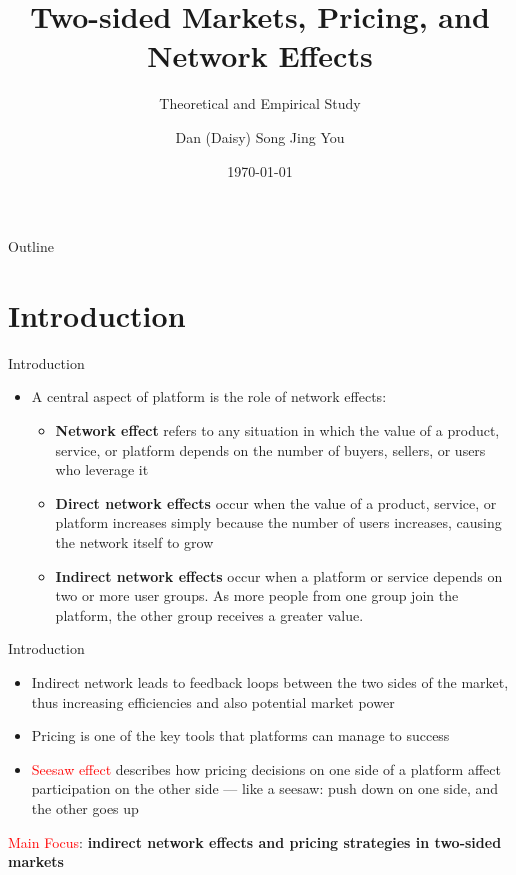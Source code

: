 \documentclass[aspectratio=169]{beamer}  %
\title{Two-sided Markets, Pricing, and Network Effects}
\subtitle{Theoretical and Empirical Study}
\author{Dan (Daisy) Song \quad Jing You}
\institute{Hong Kong University of Science and Technology}
\date{\today}
\begin{document}
\begin{frame}
    \titlepage
\end{frame}

\begin{frame}{Outline}
    \tableofcontents
\end{frame}

\section{Introduction}
\begin{frame}{Introduction}
    \begin{itemize}
        \item A central aspect of platform is the role of network effects:
        \vspace{1em}
        \begin{itemize}
            \item \textbf{Network effect} refers to any situation in which the value of a product, service, or platform depends on the number of buyers, sellers, or users who leverage it
            \vspace{1em}
            \item \textbf{Direct network effects} occur when the value of a product, service, or platform increases simply because the number of users increases, causing the network itself to grow
            \vspace{1em}
            \item \textbf{Indirect network effects} occur when a platform or service depends on two or more user groups. As more people from one group join the platform, the other group receives a greater value.
        \end{itemize}

    \end{itemize}
\end{frame}

\begin{frame}{Introduction}
    \begin{itemize}        
        \item Indirect network leads to feedback loops between the two sides of the market, thus increasing efficiencies and also potential market power
        \vspace{1em}
        \item Pricing is one of the key tools that platforms can manage to success
        \vspace{1em}
        \item \textcolor{red}{Seesaw effect} describes how pricing decisions on one side of a platform affect participation on the other side — like a seesaw: push down on one side, and the other goes up
    \end{itemize}
    \vspace{2em}

    \textcolor{red}{Main Focus}: \textbf{indirect network effects and pricing strategies in two-sided markets}
\end{frame}
\end{document}
